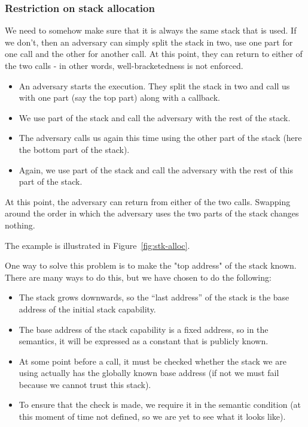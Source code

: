 \documentclass[a4paper]{article}
\begin{document}
\subsubsection{Restriction on stack allocation}
We need to somehow make sure that it is always the same stack that is used. If we don't, then an adversary can simply split the stack in two, use one part for one call and the other for another call. At this point, they can return to either of the two calls - in other words, well-bracketedness is not enforced.

\begin{itemize}
  \item An adversary starts the execution. They split the stack in two and call us with one part (say the top part) along with a callback.
  \item We use part of the stack and call the adversary with the rest of the stack.
  \item The adversary calls us again this time using the other part of the stack (here the bottom part of the stack).
  \item Again, we use part of the stack and call the adversary with the rest of this part of the stack.
\end{itemize}
At this point, the adversary can return from either of the two calls. Swapping around the order in which the adversary uses the two parts of the stack changes nothing.

The example is illustrated in Figure~\ref{fig:stk-alloc}.

One way to solve this problem is to make the "top address" of the stack known. There are many ways to do this, but we have chosen to do the following:
\begin{itemize}
\item The stack grows downwards, so the ``last address'' of the stack is the base address of the initial stack capability.
\item The base address of the stack capability is a fixed address, so in the semantics, it will be expressed as a constant that is publicly known.
\item At some point before a call, it must be checked whether the stack we are using actually has the globally known base address (if not we must fail because we cannot trust this stack).
\item To ensure that the check is made, we require it in the semantic condition (at this moment of time not defined, so we are yet to see what it looks like).
\end{itemize}
\end{document}
